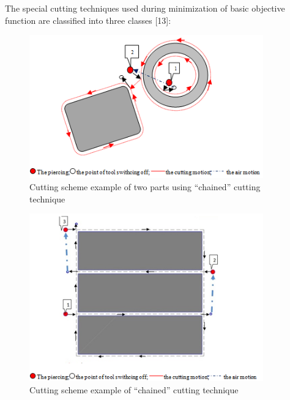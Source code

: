 \documentclass[runningheads]{llncs}
\begin{document}
The special cutting techniques used during minimization of basic objective function are classified into three classes [13]:

\begin{figure}
  \begin{center}
  \includegraphics[width=0.9\textwidth]{chain.png}
  \caption{Cutting scheme example of two parts using ``chained'' cutting technique}
  \label{chain}
  \end{center}
\end{figure}

\begin{figure}
  \begin{center}
  \includegraphics[width=0.9\textwidth]{common.png}
  \caption{Cutting scheme example of ``chained'' cutting technique}
  \label{common}
  \end{center}
\end{figure}
\end{document}
